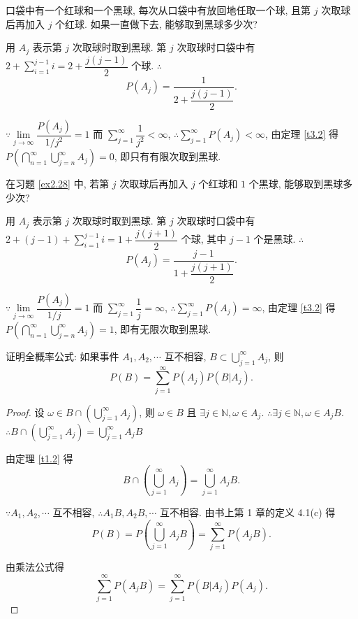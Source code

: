 \documentclass{ctexart}
\begin{document}
\addtocounter{exercise}{7}
\begin{exercise}\label{ex2.28}
    口袋中有一个红球和一个黑球, 每次从口袋中有放回地任取一个球, 且第 $j$ 次取球后再加入 $j$ 个红球. 如果一直做下去, 能够取到黑球多少次?
\end{exercise}
\begin{solution}
    用 $A_j$ 表示第 $j$ 次取球时取到黑球. 第 $j$ 次取球时口袋中有 $2+\sum\limits_{i=1}^{j-1}i=2+\dfrac{j(j-1)}{2}$ 个球. $\therefore$
    \[P(A_j)=\dfrac{1}{2+\dfrac{j(j-1)}{2}}.\]

    $\because\lim\limits_{j\to\infty}\dfrac{P(A_j)}{1/j^2}=1$ 而 $\sum\limits_{j=1}^\infty\dfrac{1}{j^2}<\infty$, $\therefore\sum\limits_{j=1}^\infty P(A_j)<\infty$, 由定理 \ref{t3.2} 得 $P\left(\bigcap\limits_{n=1}^\infty\bigcup\limits_{j=n}^\infty A_j\right)=0$, 即只有有限次取到黑球.
\end{solution}
\begin{exercise}%
    在习题 \ref{ex2.28} 中, 若第 $j$ 次取球后再加入 $j$ 个红球和 $1$ 个黑球, 能够取到黑球多少次?
\end{exercise}
\begin{solution}
    用 $A_j$ 表示第 $j$ 次取球时取到黑球. 第 $j$ 次取球时口袋中有 $2+(j-1)+\sum\limits_{i=1}^{j-1}i=1+\dfrac{j(j+1)}{2}$ 个球, 其中 $j-1$ 个是黑球. $\therefore$
    \[P(A_j)=\dfrac{j-1}{1+\dfrac{j(j+1)}{2}}.\]

    $\because\lim\limits_{j\to\infty}\dfrac{P(A_j)}{1/j}=1$ 而 $\sum\limits_{j=1}^\infty\dfrac{1}{j}=\infty$, $\therefore\sum\limits_{j=1}^\infty P(A_j)=\infty$, 由定理 \ref{t3.2} 得 $P\left(\bigcap\limits_{n=1}^\infty\bigcup\limits_{j=n}^\infty A_j\right)=1$, 即有无限次取到黑球.
\end{solution}
\begin{exercise}\label{ex2.30}
    证明全概率公式: 如果事件 $A_1,A_2,\cdots$ 互不相容, $B\subset\bigcup\limits_{j=1}^\infty A_j$, 则
    \[P(B)=\sum\limits_{j=1}^\infty P(A_j)P(B|A_j).\]
\end{exercise}
\begin{proof}
    设 $\omega\in B\cap\left(\bigcup\limits_{j=1}^\infty A_j\right)$, 则 $\omega\in B$ 且 $\exists j\in\mathbb{N},\omega\in A_j$. $\therefore\exists j\in\mathbb{N},\omega\in A_jB$. $\therefore B\cap\left(\bigcup\limits_{j=1}^\infty A_j\right)=\bigcup\limits_{j=1}^\infty A_jB$

    由定理 \ref{t1.2} 得
    \[B\cap\left(\bigcup\limits_{j=1}^\infty A_j\right)=\bigcup\limits_{j=1}^\infty A_jB.\]

    $\because A_1,A_2,\cdots$ 互不相容, $\therefore A_1B,A_2B,\cdots$ 互不相容. 由书上第 1 章的定义 4.1(c) 得
    \[P(B)=P\left(\bigcup\limits_{j=1}^\infty A_jB\right)=\sum\limits_{j=1}^\infty P(A_jB).\]

    由乘法公式得
    \[\sum\limits_{j=1}^\infty P(A_jB)=\sum\limits_{j=1}^\infty P(B|A_j)P(A_j).\]
\end{proof}
\end{document}
